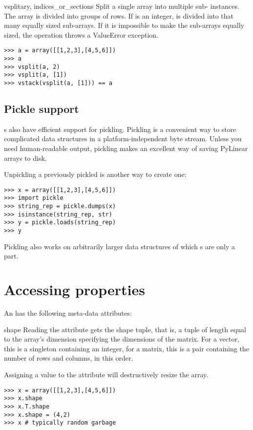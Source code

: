 \begin{funcdesc}{vsplit}{ary, indices_or_sections}
  Split a single  array into multiple sub-
  instances.  The array is divided into groups of rows.  If
   is an integer,  is divided into that
  many equally sized sub-arrays.  If it is impossible to make the sub-arrays
  equally sized, the operation throws a ValueError exception. 
  
\begin{verbatim}
>>> a = array([[1,2,3],[4,5,6]])
>>> a
>>> vsplit(a, 2)
>>> vsplit(a, [1])
>>> vstack(vsplit(a, [1])) == a
\end{verbatim}
\end{funcdesc}

\subsection{Pickle support}
s also have efficient support for pickling. Pickling is a
convenient way to store complicated data structures in a platform-independent
byte stream. Unless you need human-readable output, pickling makes an
excellent way of saving PyLinear arrays to disk.

Unpickling a previously pickled  is another way to create one:

\begin{verbatim}
>>> x = array([[1,2,3],[4,5,6]])
>>> import pickle
>>> string_rep = pickle.dumps(x)
>>> isinstance(string_rep, str)
>>> y = pickle.loads(string_rep)
>>> y
\end{verbatim}

Pickling also works on arbitrarily larger data structures of which
s are only a part.

\section{Accessing  properties}

\label{sec:arrayproperties}
An  has the following meta-data attributes:

\begin{memberdesc}[Array]{shape}
  Reading the  attribute gets the shape tuple, that is,
  a tuple of length equal to the array's dimension specifying the
  dimensions of the matrix.  For a vector, this is a singleton
  containing an integer, for a matrix, this is a pair containing the
  number of rows and columns, in this order.  

  Assigning a value to the  attribute will destructively
  resize the array.

\begin{verbatim}
>>> x = array([[1,2,3],[4,5,6]])
>>> x.shape
>>> x.T.shape
>>> x.shape = (4,2)
>>> x # typically random garbage
\end{verbatim}
\end{memberdesc}

